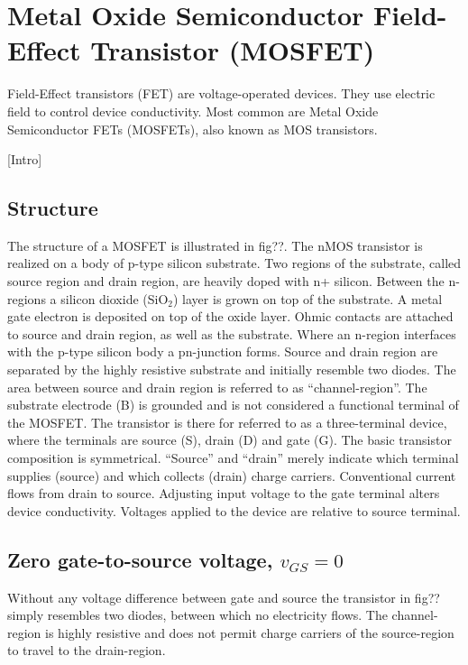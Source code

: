 \section{Metal Oxide Semiconductor Field-Effect Transistor (MOSFET)}

Field-Effect transistors (FET) are voltage-operated devices. They use electric field to control device conductivity. Most common are Metal Oxide Semiconductor FETs (MOSFETs), also known as MOS transistors.

[Intro]

\subsection{Structure}
The structure of a MOSFET is illustrated in fig??. The nMOS transistor is realized on a body of p-type silicon substrate. Two regions of the substrate, called source region and drain region, are heavily doped with n+ silicon. Between the n-regions a silicon dioxide (SiO$_2$) layer is grown on top of the substrate. A metal gate electron is deposited on top of the oxide layer. Ohmic contacts are attached to source and drain region, as well as the substrate.
Where an n-region interfaces with the p-type silicon body a pn-junction forms. Source and drain region are separated by the highly resistive substrate and initially resemble two diodes. The area between source and drain region is referred to as “channel-region”.
The substrate electrode (B) is grounded and is not considered a functional terminal of the MOSFET. The transistor is there for referred to as a three-terminal device, where the terminals are source (S), drain (D) and gate (G).
The basic transistor composition is symmetrical. “Source” and “drain” merely indicate which terminal supplies (source) and which collects (drain) charge carriers. Conventional current flows from drain to source. Adjusting input voltage to the gate terminal alters device conductivity. Voltages applied to the device are relative to source terminal.


\subsection{Zero gate-to-source voltage, $v_{{GS}}=0$}
Without any voltage difference between gate and source the transistor in fig?? simply resembles two diodes, between which no electricity flows. The channel-region is highly resistive and does not permit charge carriers of the source-region to travel to the drain-region.

